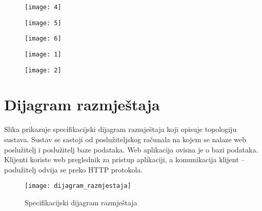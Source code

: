 {		  \begin{figure}[H]
		 	
		 	\texttt{[image: 4]}
		 
		 	
		 \end{figure}
	 
	  \begin{figure}[H]
	 	
	 	\texttt{[image: 5]}

	 	
	 \end{figure}
 
  \begin{figure}[H]
 	
 	\texttt{[image: 6]}

 	
 \end{figure}
 \begin{figure}[H]
	
	\texttt{[image: 1]}

	
\end{figure}

 \begin{figure}[H]
	
	\texttt{[image: 2]}

	
\end{figure}
		
		\eject
		
		\section{Dijagram razmještaja}
			
			{Slika prikazuje specifikacijski dijagram razmještaja koji opisuje topologiju sustava. Sustav se sastoji od poslužiteljskog računala na kojem se nalaze web poslužitelj i poslužitelj baze podataka. Web aplikacija ovisna je o bazi podataka. Klijenti koriste web preglednik za pristup aplikaciji, a komunikacija klijent – poslužitelj odvija se preko HTTP protokola.}
			 
			 \begin{figure}[H]
			 	
			 	\texttt{[image: dijagram\_razmjestaja]}
			 	\caption{Specifikacijski dijagram razmještaja}
			 	
			 \end{figure}
			
}

